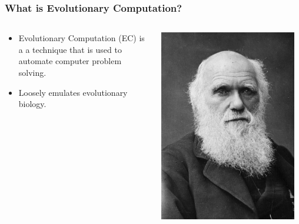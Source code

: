 \documentclass{beamer}
\begin{document}
\begin{frame}
  \frametitle{What is Evolutionary Computation?}
  \begin{columns}
  \begin{column}{0.6\textwidth}
  \begin{itemize}
  	\item Evolutionary Computation (EC) is a a technique that is used to automate computer problem solving.
  	\item Loosely emulates evolutionary biology.
  \end{itemize}
  \end{column}
  \begin{column}{0.4\textwidth}
   \includegraphics[width=0.95\textwidth]{Illustrations/darwin.jpg}
       \\
  \end{column}
  \end{columns}
\end{frame}
\end{document}
